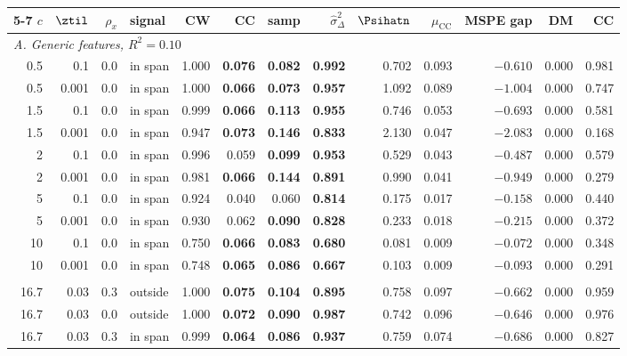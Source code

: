 \begin{table}[htbp]
\begin{tabular}{rrrlrrrrrrrrr}
\cmidrule(lr){5-7}
$c$ & $\ztil$ & $\rho_x$ & signal & CW & CC & samp & $\hat\sigma^2_\Delta$ & $\Psihatn$ & $\mu_{\mathrm{CC}}$ & MSPE gap & DM & CC \\
\midrule
\multicolumn{13}{l}{\emph{A. Generic features, $R^2=0.10$}} \\
0.5 & 0.1 & 0.0 & in span & 1.000 & \textbf{0.076} & \textbf{0.082} & \textbf{0.992} & 0.702 & 0.093 & $-0.610$ & 0.000 & 0.981 \\
0.5 & 0.001 & 0.0 & in span & 1.000 & \textbf{0.066} & \textbf{0.073} & \textbf{0.957} & 1.092 & 0.089 & $-1.004$ & 0.000 & 0.747 \\
1.5 & 0.1 & 0.0 & in span & 0.999 & \textbf{0.066} & \textbf{0.113} & \textbf{0.955} & 0.746 & 0.053 & $-0.693$ & 0.000 & 0.581 \\
1.5 & 0.001 & 0.0 & in span & 0.947 & \textbf{0.073} & \textbf{0.146} & \textbf{0.833} & 2.130 & 0.047 & $-2.083$ & 0.000 & 0.168 \\
2 & 0.1 & 0.0 & in span & 0.996 & 0.059 & \textbf{0.099} & \textbf{0.953} & 0.529 & 0.043 & $-0.487$ & 0.000 & 0.579 \\
2 & 0.001 & 0.0 & in span & 0.981 & \textbf{0.066} & \textbf{0.144} & \textbf{0.891} & 0.990 & 0.041 & $-0.949$ & 0.000 & 0.279 \\
5 & 0.1 & 0.0 & in span & 0.924 & 0.040 & 0.060 & \textbf{0.814} & 0.175 & 0.017 & $-0.158$ & 0.000 & 0.440 \\
5 & 0.001 & 0.0 & in span & 0.930 & 0.062 & \textbf{0.090} & \textbf{0.828} & 0.233 & 0.018 & $-0.215$ & 0.000 & 0.372 \\
10 & 0.1 & 0.0 & in span & 0.750 & \textbf{0.066} & \textbf{0.083} & \textbf{0.680} & 0.081 & 0.009 & $-0.072$ & 0.000 & 0.348 \\
10 & 0.001 & 0.0 & in span & 0.748 & \textbf{0.065} & \textbf{0.086} & \textbf{0.667} & 0.103 & 0.009 & $-0.093$ & 0.000 & 0.291 \\
\addlinespace
\multicolumn{13}{l}{\emph{B. Random Fourier features, $R^2=0.10$}} \\
16.7 & 0.03 & 0.3 & outside & 1.000 & \textbf{0.075} & \textbf{0.104} & \textbf{0.895} & 0.758 & 0.097 & $-0.662$ & 0.000 & 0.959 \\
16.7 & 0.03 & 0.0 & outside & 1.000 & \textbf{0.072} & \textbf{0.090} & \textbf{0.987} & 0.742 & 0.096 & $-0.646$ & 0.000 & 0.976 \\
16.7 & 0.03 & 0.3 & in span & 0.999 & \textbf{0.064} & \textbf{0.086} & \textbf{0.937} & 0.759 & 0.074 & $-0.686$ & 0.000 & 0.827 \\

\end{tabular}
\end{table}
